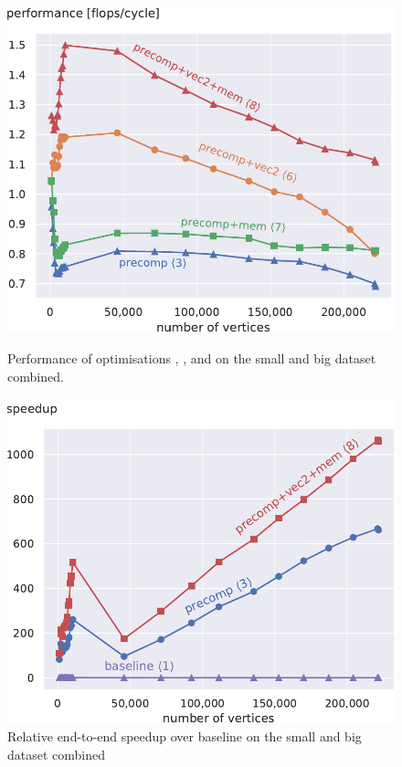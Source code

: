 \documentclass[final,letterpaper]{article}
\begin{document}
\begin{figure}[!t]
\begin{minipage}[t]{\oldlinewidth}\centering
	\includegraphics[width=\linewidth]{img/performance[3][6][7][8]_both.pdf}
	\caption{Performance of optimisations , ,  and  on the small and big dataset combined. \label{cpctVectPerformanceBoth}}
\end{minipage}%
\hspace{7.2mm}
\begin{minipage}[t]{\oldlinewidth}\centering
	\includegraphics[width=\linewidth]{img/speedup[1][3][8]_both.pdf}
	\caption{Relative end-to-end speedup over baseline  on the small and big dataset combined} \label{speedupEndToEnd}
\end{minipage}%
\end{figure}
\end{document}
